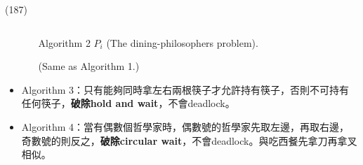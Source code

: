 \begin{theorem}{(187)}
\begin{itemize}
\begin{itemize}
\begin{lstlisting}[caption={Shared variables of The dining-philosophers problem.}, captionpos=b, mathescape=true]
            \end{lstlisting}
            \begin{algorithm}[H]
                \caption{Algorithm 2 $P_i$ (The dining-philosophers problem).}
                \begin{algorithmic}[1]
                        \Repeat
                            \State {}
                            \State (Same as Algorithm 1.) 
                            \State {}
                    \EndFunction
                \end{algorithmic}
            \end{algorithm}
        \end{itemize}
        \item Algorithm 3：只有能夠同時拿左右兩根筷子才允許持有筷子，否則不可持有任何筷子，\textbf{破除hold and wait}，不會deadlock。
        \item Algorithm 4：當有偶數個哲學家時，偶數號的哲學家先取左邊，再取右邊，奇數號的則反之，\textbf{破除circular wait}，不會deadlock。與吃西餐先拿刀再拿叉相似。
    \end{itemize}
\end{theorem}

